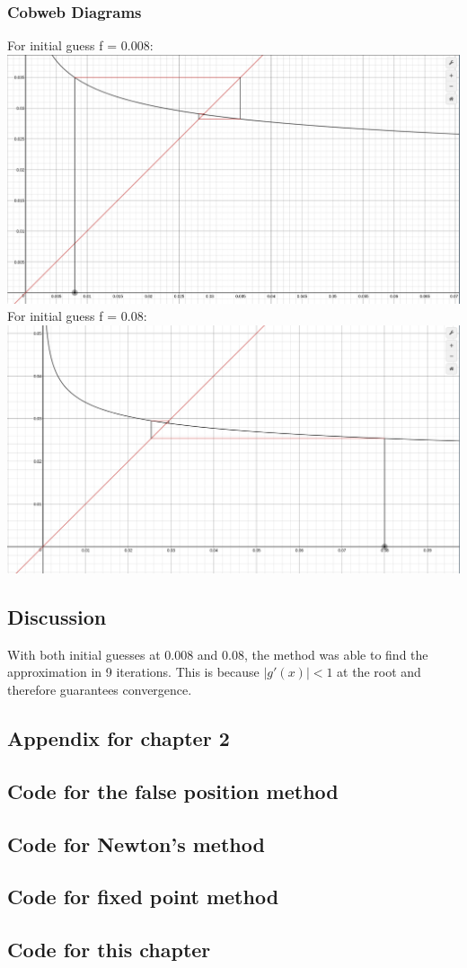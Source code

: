 \documentclass{book}
\begin{document}
    \subsubsection{Cobweb Diagrams}
    For initial guess f = 0.008: \\
    \includegraphics[scale=0.2]{second.png}\\
    For initial guess f = 0.08: \\
    \includegraphics[scale=0.2]{first.png}\\
    \subsection{Discussion}
    With both initial guesses at 0.008 and 0.08, the method was able to find the approximation in 9 iterations. This is because ${|g'(x)| < 1}$ at the root and therefore guarantees convergence.
    \subsection{Appendix for chapter 2}
    \subsection{Code for the false position method}
	
    \subsection{Code for Newton's method}
	
    \subsection{Code for fixed point method}
	
    \subsection{Code for this chapter}
	
	
\end{document}

